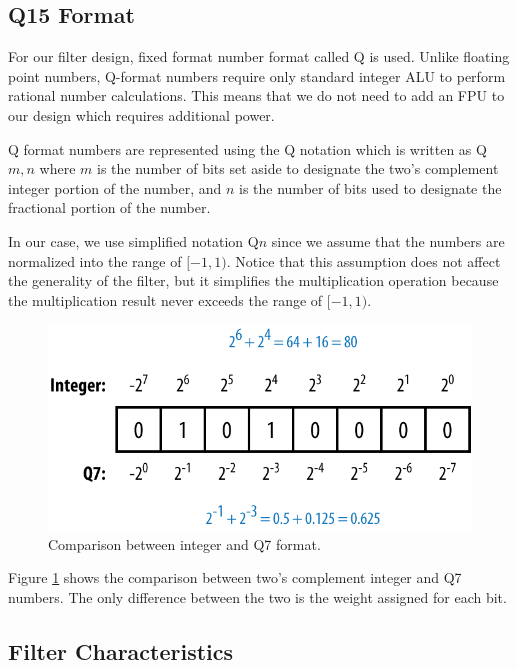 \subsection{Q15 Format} \label{sec:q15}

For our filter design, fixed format number format called Q is used. Unlike floating point numbers, Q-format numbers require only standard integer ALU to perform rational number calculations. This means that we do not need to add an FPU to our design which requires additional power.

Q format numbers are represented using the Q notation which is written as Q$m,n$ where $m$ is the number of bits set aside to designate the two's complement integer portion of the number, and $n$ is the number of bits used to designate the fractional portion of the number.

In our case, we use simplified notation Q$n$ since we assume that the numbers are normalized into the range of $[-1, 1)$. Notice that this assumption does not affect the generality of the filter, but it simplifies the multiplication operation because the multiplication result never exceeds the range of $[-1, 1)$.

\begin{figure}[htbp]
	\centering
	\includegraphics[scale=1.5]{images/q7}
	\caption{Comparison between integer and Q7 format.}
	\label{fig:q7}
\end{figure}

Figure \ref{fig:q7} shows the comparison between two's complement integer and Q7 numbers. The only difference between the two is the weight assigned for each bit.

\subsection{Filter Characteristics}


